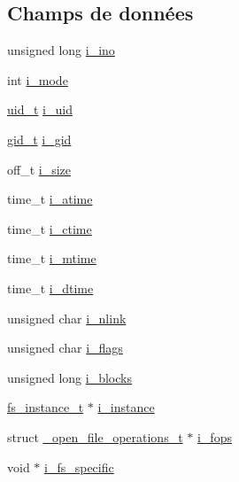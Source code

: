 \subsection*{\-Champs de données}
\begin{DoxyCompactItemize}
\item 
unsigned long \hyperlink{struct__inode__t_aba602b843ba63a32ca3950dbaf7e959c}{i\-\_\-ino}
\item 
int \hyperlink{struct__inode__t_acead4732b6c22ef17ada59203509e728}{i\-\_\-mode}
\item 
\hyperlink{kstat_8h_af2306308627701b66dc6f3babe821ab4}{uid\-\_\-t} \hyperlink{struct__inode__t_a7ddcb65050ac0b4c9cfbacd495d56f4b}{i\-\_\-uid}
\item 
\hyperlink{kstat_8h_aa7352f1065fe606194d792e2b292cf83}{gid\-\_\-t} \hyperlink{struct__inode__t_a95d052a6e9b1b1e4f6837fa0f33b393e}{i\-\_\-gid}
\item 
off\-\_\-t \hyperlink{struct__inode__t_aed37b31c96c90873201abfc8b4b3e463}{i\-\_\-size}
\item 
time\-\_\-t \hyperlink{struct__inode__t_a01f50c6c44a3b50e4414a794643b741f}{i\-\_\-atime}
\item 
time\-\_\-t \hyperlink{struct__inode__t_a73ee1e604547b74b8e1045fd4f6699b6}{i\-\_\-ctime}
\item 
time\-\_\-t \hyperlink{struct__inode__t_a331d724391efce2f89aeb1a503ae5c43}{i\-\_\-mtime}
\item 
time\-\_\-t \hyperlink{struct__inode__t_a393de4c58241168fdf397ab8421a3539}{i\-\_\-dtime}
\item 
unsigned char \hyperlink{struct__inode__t_a929fc1e6837d02a2525027a121b4e67e}{i\-\_\-nlink}
\item 
unsigned char \hyperlink{struct__inode__t_a36ff48a57a9e483d74682972d31ef46c}{i\-\_\-flags}
\item 
unsigned long \hyperlink{struct__inode__t_a92ebe4c1e93af9fba4efae4d07e14858}{i\-\_\-blocks}
\item 
\hyperlink{vfs_8h_a0eefa9aac35a5462ebf1e038992ca860}{fs\-\_\-instance\-\_\-t} $\ast$ \hyperlink{struct__inode__t_affefc88b22f45e2ec8340d582486d0f2}{i\-\_\-instance}
\item 
struct \hyperlink{struct__open__file__operations__t}{\-\_\-open\-\_\-file\-\_\-operations\-\_\-t} $\ast$ \hyperlink{struct__inode__t_acf149d7d1601f78142b1eec480badf7e}{i\-\_\-fops}
\item 
void $\ast$ \hyperlink{struct__inode__t_a54e34439c448c46bae90fd040dadc5c0}{i\-\_\-fs\-\_\-specific}
\end{DoxyCompactItemize}


